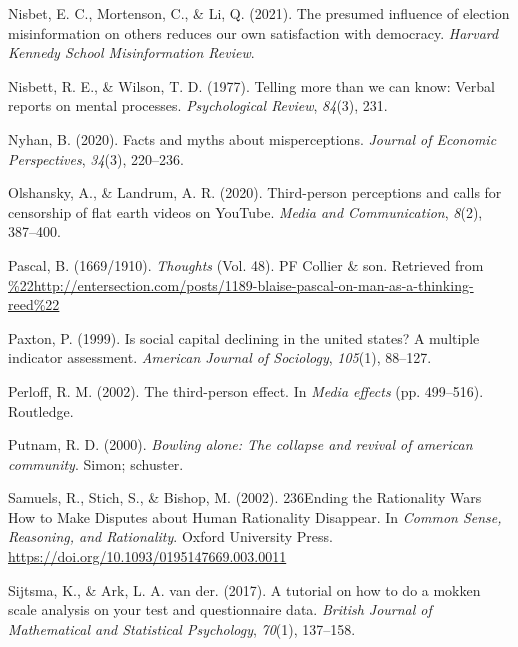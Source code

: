 \documentclass[
  ,jou,floatsintext]{apa6}
\newlength{\cslhangindent}
\newlength{\cslentryspacingunit} %
\newenvironment{CSLReferences}[2] %
 {%
  \setlength{\parindent}{0pt}
  \ifodd #1
  \let\oldpar\par
  \def\par{\hangindent=\cslhangindent\oldpar}
  \fi
  \setlength{\parskip}{#2\cslentryspacingunit}
 }%
 {}
\begin{document}
\begin{CSLReferences}{1}{0}
\leavevmode{}%
Nisbet, E. C., Mortenson, C., \& Li, Q. (2021). The presumed influence of election misinformation on others reduces our own satisfaction with democracy. \emph{Harvard Kennedy School Misinformation Review}.

\leavevmode{}%
Nisbett, R. E., \& Wilson, T. D. (1977). Telling more than we can know: Verbal reports on mental processes. \emph{Psychological Review}, \emph{84}(3), 231.

\leavevmode{}%
Nyhan, B. (2020). Facts and myths about misperceptions. \emph{Journal of Economic Perspectives}, \emph{34}(3), 220--236.

\leavevmode{}%
Olshansky, A., \& Landrum, A. R. (2020). Third-person perceptions and calls for censorship of flat earth videos on YouTube. \emph{Media and Communication}, \emph{8}(2), 387--400.

\leavevmode{}%
Pascal, B. (1669/1910). \emph{Thoughts} (Vol. 48). PF Collier \& son. Retrieved from \url{\%22http://entersection.com/posts/1189-blaise-pascal-on-man-as-a-thinking-reed\%22}

\leavevmode{}%
Paxton, P. (1999). Is social capital declining in the united states? A multiple indicator assessment. \emph{American Journal of Sociology}, \emph{105}(1), 88--127.

\leavevmode{}%
Perloff, R. M. (2002). The third-person effect. In \emph{Media effects} (pp. 499--516). Routledge.

\leavevmode{}%
Putnam, R. D. (2000). \emph{Bowling alone: The collapse and revival of american community}. Simon; schuster.

\leavevmode{}%
Samuels, R., Stich, S., \& Bishop, M. (2002). {236Ending the Rationality Wars How to Make Disputes about Human Rationality Disappear}. In \emph{{Common Sense, Reasoning, and Rationality}}. Oxford University Press. \url{https://doi.org/10.1093/0195147669.003.0011}

\leavevmode{}%
Sijtsma, K., \& Ark, L. A. van der. (2017). A tutorial on how to do a mokken scale analysis on your test and questionnaire data. \emph{British Journal of Mathematical and Statistical Psychology}, \emph{70}(1), 137--158.


\end{CSLReferences}
\end{document}
